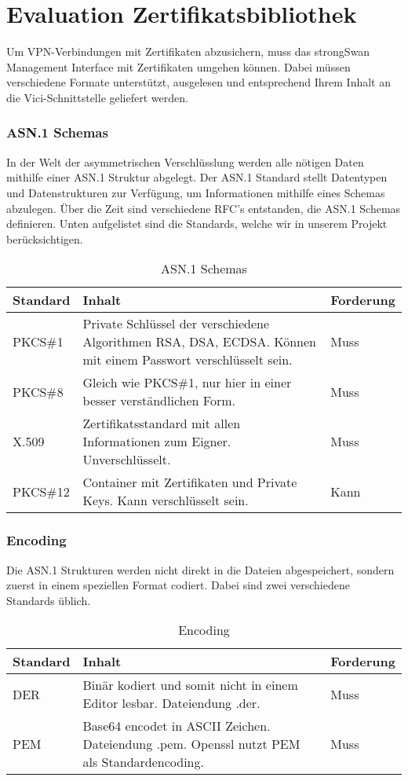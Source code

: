 \section{Evaluation Zertifikatsbibliothek}
Um VPN-Verbindungen mit Zertifikaten abzusichern, muss das strongSwan Management Interface mit Zertifikaten umgehen können. Dabei müssen verschiedene Formate unterstützt, ausgelesen und entsprechend Ihrem Inhalt an die Vici-Schnittstelle geliefert werden.
\subsubsection{ASN.1 Schemas}
In der Welt der asymmetrischen Verschlüsslung werden alle nötigen Daten mithilfe einer ASN.1 Struktur abgelegt. Der ASN.1 Standard stellt Datentypen und Datenstrukturen zur Verfügung, um Informationen mithilfe eines Schemas abzulegen. Über die Zeit sind verschiedene RFC’s entstanden, die ASN.1 Schemas definieren. Unten aufgelistet sind die Standards, welche wir in unserem Projekt berücksichtigen. \medskip

\begin{table}[H]
\centering
    \begin{tabular}{|l|p{12cm}|l|}
    \hline
    \rowcolor{lightblue}
    Standard & Inhalt & Forderung   \\ \hline
	PKCS\#1	&	Private Schlüssel der verschiedene Algorithmen RSA, DSA, ECDSA. Können mit einem Passwort verschlüsselt sein.	& Muss \\ \hline	
		PKCS\#8	&	Gleich wie PKCS\#1, nur hier in einer besser verständlichen Form.	& Muss \\ \hline	
		X.509	&	Zertifikatsstandard mit allen Informationen zum Eigner. Unverschlüsselt.	& Muss \\ \hline
		PKCS\#12	&	Container mit Zertifikaten und Private Keys. Kann verschlüsselt sein.	& Kann \\ \hline		
	\end{tabular}
    \caption[ASN.1 Schemas]{ASN.1 Schemas}
\end{table}

\subsubsection{Encoding}
Die ASN.1 Strukturen werden nicht direkt in die Dateien abgespeichert, sondern zuerst in einem speziellen Format codiert. Dabei sind zwei verschiedene Standards üblich. \medskip

\begin{table}[H]
\centering
    \begin{tabular}{|l|p{12cm}|l|}
    \hline
    \rowcolor{lightblue}
    Standard & Inhalt & Forderung   \\ \hline
	DER	&	Binär kodiert und somit nicht in einem Editor lesbar. Dateiendung .der.	& Muss \\ \hline	
		PEM	&	
Base64 encodet in ASCII Zeichen. Dateiendung .pem. Openssl nutzt PEM als Standardencoding.	& Muss \\ \hline		
	\end{tabular}
    \caption[Encoding]{Encoding}
\end{table}

